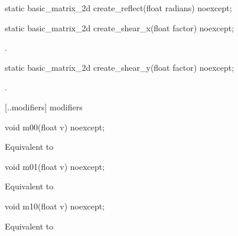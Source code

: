 %
\begin{itemdecl}
static basic_matrix_2d create_reflect(float radians) noexcept;
\end{itemdecl}
\begin{itemdescr}
\pnum
\returns
{}
\end{itemdescr}

%
\begin{itemdecl}
static basic_matrix_2d create_shear_x(float factor) noexcept;
\end{itemdecl}
\begin{itemdescr}
\pnum
\returns
{}.
\end{itemdescr}

%
\begin{itemdecl}
static basic_matrix_2d create_shear_y(float factor) noexcept;
\end{itemdecl}
\begin{itemdescr}
\pnum
\returns
{}.
\end{itemdescr}

 [\iotwod.\matrixtwod.modifiers] { modifiers}

%
\begin{itemdecl}
void m00(float v) noexcept;
\end{itemdecl}
\begin{itemdescr}
\pnum
\effects
Equivalent to 
\end{itemdescr}

%
\begin{itemdecl}
void m01(float v) noexcept;
\end{itemdecl}
\begin{itemdescr}
\pnum
\effects
Equivalent to 
\end{itemdescr}

%
\begin{itemdecl}
void m10(float v) noexcept;
\end{itemdecl}
\begin{itemdescr}
\pnum
\effects
Equivalent to 
\end{itemdescr}


